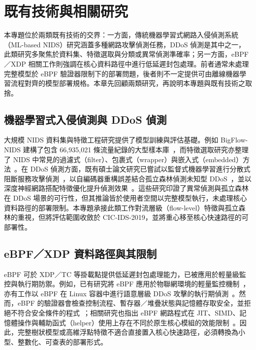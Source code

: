 \documentclass[12pt, a4paper, fontset=none]{ctexart}
\begin{document}
\section{既有技術與相關研究}
\label{sec:related}

本專題位於兩類既有技術的交界：一方面，傳統機器學習式網路入侵偵測系統（ML-based NIDS）研究涵蓋多種網路攻擊偵測任務，DDoS 偵測是其中之一，此類研究多聚焦於資料集、特徵選取與分類或異常偵測準確率；另一方面，eBPF／XDP 相關工作則強調在核心資料路徑中進行低延遲封包處理。前者通常未處理完整模型於 eBPF 驗證器限制下的部署問題，後者則不一定提供可由離線機器學習流程對齊的模型部署規格。本章先回顧兩類研究，再說明本專題與既有技術之取捨。

\subsection{機器學習式入侵偵測與 DDoS 偵測}
大規模 NIDS 資料集與特徵工程研究提供了模型訓練與評估基礎。例如 BigFlow-NIDS 建構了包含 66{,}935{,}021 條流量紀錄的大型樣本庫~\cite{uddin2026bigflow}，而特徵選取研究亦整理了 NIDS 中常見的過濾式（filter）、包裹式（wrapper）與嵌入式（embedded）方法~\cite{verma2022feature}。在 DDoS 偵測方面，既有碩士論文研究已嘗試以監督式機器學習進行分散式阻斷服務攻擊偵測~\cite{sun2019ml}，以自編碼器重構誤差結合孤立森林偵測未知型 DDoS~\cite{zhao2024autoencoder}，並以深度神經網路搭配特徵優化提升偵測效果~\cite{wu2024dnn}。這些研究印證了異常偵測與孤立森林在 DDoS 場景的可行性，但其推論皆於使用者空間以完整模型執行，未處理核心資料路徑的部署限制。本專題承接此類工作對流層級（flow-level）特徵與孤立森林的重視，但將評估範圍收斂於 CIC-IDS-2019，並將重心移至核心快速路徑的可部署性。

\subsection{eBPF／XDP 資料路徑與其限制}
eBPF 可於 XDP／TC 等掛載點提供低延遲封包處理能力，已被應用於輕量級監控與執行期防禦。例如，已有研究將 eBPF 應用於物聯網環境的輕量監控機制~\cite{lai2022ebpf}，亦有工作以 eBPF 在 Linux 容器中進行語意層級 DDoS 攻擊的執行期偵測~\cite{remya2025ebpf}。然而，eBPF 的驗證器會檢查控制流程、暫存器／堆疊狀態與記憶體存取安全，並拒絕不符合安全條件的程式~\cite{linuxBpfVerifier}；相關研究也指出 eBPF 網路程式在 JIT、SIMD、記憶體操作與輔助函式（helper）使用上存在不同於原生核心模組的效能限制~\cite{shahinfar2025demystifying}。因此，完整樹狀模型或高維浮點特徵不適合直接置入核心快速路徑，必須轉換為小型、整數化、可查表的部署形式。
\end{document}
